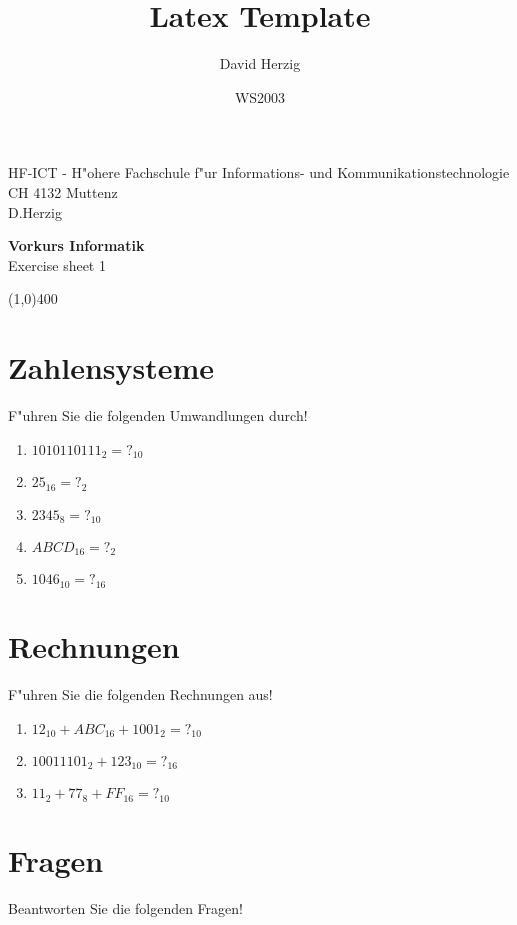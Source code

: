 \documentclass[a4paper,10pt]{article}
\title{Latex Template}
\author{David Herzig}
\date{WS2003}
\begin{document}
HF-ICT - H"ohere Fachschule f"ur Informations- und Kommunikationstechnologie\\
CH 4132 Muttenz\\
D.Herzig

\vspace{2mm}

\begin{center}
{\Large \bf Vorkurs Informatik}\\
Exercise sheet 1
\end{center}

\vspace{2mm}

\line(1,0){400}

\vspace{5mm}

\section{Zahlensysteme}

F"uhren Sie die folgenden Umwandlungen durch!

\begin{enumerate}
\item $1010110111_{2} = ?_{10}$
\item $25_{16} = ?_{2}$
\item $2345_{8} = ?_{10}$
\item $ABCD_{16} = ?_{2}$
\item $1046_{10} = ?_{16}$
\end{enumerate}

\section{Rechnungen}
F"uhren Sie die folgenden Rechnungen aus!

\begin{enumerate}
\item $12_{10} + ABC_{16} + 1001_{2} = ?_{10}$
\item $10011101_{2} + 123_{10} = ?_{16}$
\item $11_{2} + 77_{8} + FF_{16} = ?_{10}$
\end{enumerate}


\section{Fragen}

Beantworten Sie die folgenden Fragen!
\end{document}
